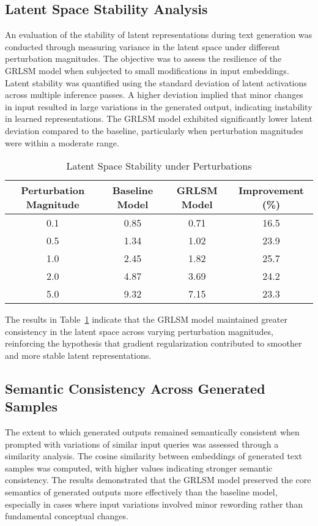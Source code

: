 \documentclass{article}
\begin{document}
\subsection{Latent Space Stability Analysis}

An evaluation of the stability of latent representations during text generation was conducted through measuring variance in the latent space under different perturbation magnitudes. The objective was to assess the resilience of the GRLSM model when subjected to small modifications in input embeddings. Latent stability was quantified using the standard deviation of latent activations across multiple inference passes. A higher deviation implied that minor changes in input resulted in large variations in the generated output, indicating instability in learned representations. The GRLSM model exhibited significantly lower latent deviation compared to the baseline, particularly when perturbation magnitudes were within a moderate range.

\begin{table}[h]
	\centering
	\caption{Latent Space Stability under Perturbations}
	\label{tab:latent_stability}
	\begin{tabular}{|c|c|c|c|}
		\hline
		\textbf{Perturbation Magnitude} & \textbf{Baseline Model} & \textbf{GRLSM Model} & \textbf{Improvement (\%)} \\
		\hline
		0.1 & 0.85 & 0.71 & 16.5 \\
		\hline
		0.5 & 1.34 & 1.02 & 23.9 \\
		\hline
		1.0 & 2.45 & 1.82 & 25.7 \\
		\hline
		2.0 & 4.87 & 3.69 & 24.2 \\
		\hline
		5.0 & 9.32 & 7.15 & 23.3 \\
		\hline
	\end{tabular}
\end{table}

The results in Table~\ref{tab:latent_stability} indicate that the GRLSM model maintained greater consistency in the latent space across varying perturbation magnitudes, reinforcing the hypothesis that gradient regularization contributed to smoother and more stable latent representations.

\subsection{Semantic Consistency Across Generated Samples}

The extent to which generated outputs remained semantically consistent when prompted with variations of similar input queries was assessed through a similarity analysis. The cosine similarity between embeddings of generated text samples was computed, with higher values indicating stronger semantic consistency. The results demonstrated that the GRLSM model preserved the core semantics of generated outputs more effectively than the baseline model, especially in cases where input variations involved minor rewording rather than fundamental conceptual changes.
\end{document}
